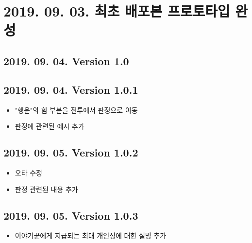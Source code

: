 \documentclass[12pt]{report}
\begin{document}
	\section*{2019. 09. 03. 최초 배포본 프로토타입 완성}
		\subsection*{2019. 09. 04. Version 1.0}
		
		\subsection*{2019. 09. 04. Version 1.0.1}
		\begin{itemize}
			\item "행운"의 힘 부분을 전투에서 판정으로 이동
			\item 판정에 관련된 예시 추가
		\end{itemize}
		
		\subsection*{2019. 09. 05. Version 1.0.2}
		\begin{itemize}
			\item 오타 수정
			\item 판정 관련된 내용 추가
		\end{itemize}
		
		\subsection{2019. 09. 05. Version 1.0.3}
		\begin{itemize}
			\item 이야기꾼에게 지급되는 최대 개연성에 대한 설명 추가
		\end{itemize}
		
	
\end{document}
